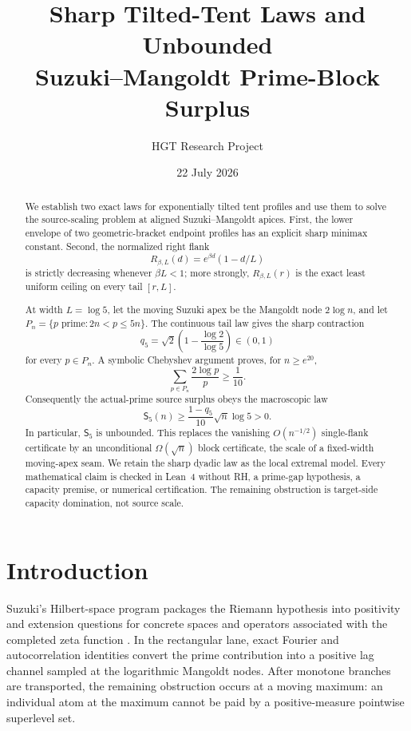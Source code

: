 \documentclass[11pt]{article}
\title{Sharp Tilted-Tent Laws and Unbounded\\Suzuki--Mangoldt Prime-Block Surplus}
\author{HGT Research Project}
\date{22 July 2026}
\newcommand{\Sur}{\mathsf S}
\begin{document}
\maketitle

\begin{abstract}
We establish two exact laws for exponentially tilted tent profiles and use them to solve the
source-scaling problem at aligned Suzuki--Mangoldt apices.  First, the lower envelope of two
geometric-bracket endpoint profiles has an explicit sharp minimax constant.  Second, the normalized
right flank
\[
 R_{\beta,L}(d)=e^{\beta d}(1-d/L)
\]
is strictly decreasing whenever $\beta L<1$; more strongly, $R_{\beta,L}(r)$ is the exact least
uniform ceiling on every tail $[r,L]$.

At width $L=\log5$, let the moving Suzuki apex be the Mangoldt node $2\log n$, and let
$P_n=\{p\text{ prime}:2n<p\le5n\}$.  The continuous tail law gives the sharp contraction
\[
 q_5=\sqrt2\left(1-\frac{\log2}{\log5}\right)\in(0,1)
\]
for every $p\in P_n$.  A symbolic Chebyshev argument proves, for $n\ge e^{20}$,
\[
 \sum_{p\in P_n}\frac{2\log p}{p}\ge\frac1{10}.
\]
Consequently the actual-prime source surplus obeys the macroscopic law
\[
 \Sur_5(n)\ge
 \frac{1-q_5}{10}\sqrt n\log5>0.
\]
In particular, $\Sur_5$ is unbounded.  This replaces the vanishing $O(n^{-1/2})$ single-flank
certificate by an unconditional $\Omega(\sqrt n)$ block certificate, the scale of a fixed-width
moving-apex seam.  We retain the sharp dyadic law as the local extremal model.  Every mathematical
claim is checked in Lean~4 without RH, a prime-gap hypothesis, a capacity premise, or numerical
certification.  The remaining obstruction is target-side capacity domination, not source scale.
\end{abstract}

\section{Introduction}\leavevmode\par

Suzuki's Hilbert-space program packages the Riemann hypothesis into positivity and extension
questions for concrete spaces and operators associated with the completed zeta function
\cite{Suzuki2026}.  In the rectangular lane, exact Fourier and autocorrelation identities convert
the prime contribution into a positive lag channel sampled at the logarithmic Mangoldt nodes.
After monotone branches are transported, the remaining obstruction occurs at a moving maximum:
an individual atom at the maximum cannot be paid by a positive-measure pointwise superlevel set.
\end{document}
